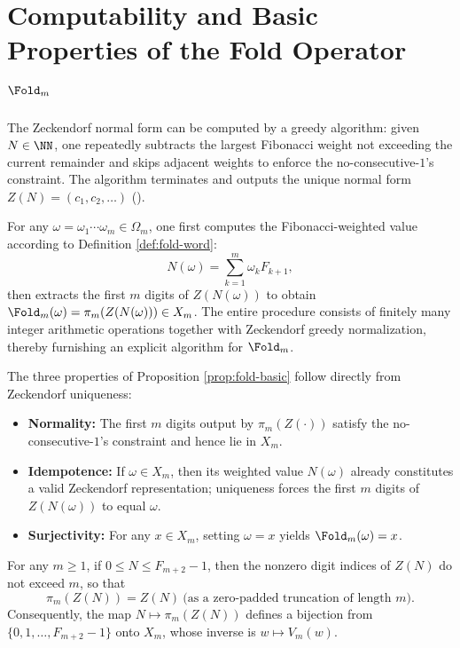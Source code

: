 \section{Computability and Basic Properties of the Fold Operator \texorpdfstring{$\Fold_m$}{Fold\_m}}
\label{app:fold-computability}

The Zeckendorf normal form can be computed by a greedy algorithm: given $N\in\NN$, one repeatedly subtracts the largest Fibonacci weight not exceeding the current remainder and skips adjacent weights to enforce the no-consecutive-$1$'s constraint. The algorithm terminates and outputs the unique normal form $Z(N)=(c_1,c_2,\dots)$ (\cite{Zeckendorf1972}).

For any $\omega=\omega_1\cdots\omega_m\in\Omega_m$, one first computes the Fibonacci-weighted value according to Definition \ref{def:fold-word}:
\[
N(\omega)=\sum_{k=1}^m \omega_k F_{k+1},
\]
then extracts the first $m$ digits of $Z(N(\omega))$ to obtain $\Fold_m(\omega)=\pi_m(Z(N(\omega)))\in X_m$. The entire procedure consists of finitely many integer arithmetic operations together with Zeckendorf greedy normalization, thereby furnishing an explicit algorithm for $\Fold_m$.

The three properties of Proposition \ref{prop:fold-basic} follow directly from Zeckendorf uniqueness:
\begin{itemize}
  \item \textbf{Normality:} The first $m$ digits output by $\pi_m(Z(\cdot))$ satisfy the no-consecutive-$1$'s constraint and hence lie in $X_m$.
  \item \textbf{Idempotence:} If $\omega\in X_m$, then its weighted value $N(\omega)$ already constitutes a valid Zeckendorf representation; uniqueness forces the first $m$ digits of $Z(N(\omega))$ to equal $\omega$.
  \item \textbf{Surjectivity:} For any $x\in X_m$, setting $\omega=x$ yields $\Fold_m(\omega)=x$.
\end{itemize}

\begin{lemma}\label{lem:zeckendorf-range-bijection}
For any $m\ge 1$, if $0\le N\le F_{m+2}-1$, then the nonzero digit indices of $Z(N)$ do not exceed $m$, so that
\[
\pi_m(Z(N))=Z(N)\ \text{(as a zero-padded truncation of length }m\text{)}.
\]
Consequently, the map $N\mapsto \pi_m(Z(N))$ defines a bijection from $\{0,1,\dots,F_{m+2}-1\}$ onto $X_m$, whose inverse is $w\mapsto V_m(w)$.
\end{lemma}

